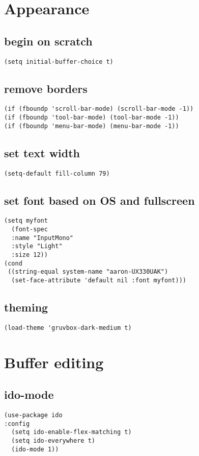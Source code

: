 \documentclass[11pt]{article}
\author{Aaron}
\date{\today}
\title{}
\begin{document}
\tableofcontents

\section{Appearance}
\label{sec:org61c10cf}
\subsection{begin on \textbf{scratch}}
\label{sec:org14f1034}
\begin{verbatim}
(setq initial-buffer-choice t)
\end{verbatim}
\subsection{remove borders}
\label{sec:org0f527e0}
\begin{verbatim}
(if (fboundp 'scroll-bar-mode) (scroll-bar-mode -1))
(if (fboundp 'tool-bar-mode) (tool-bar-mode -1))
(if (fboundp 'menu-bar-mode) (menu-bar-mode -1))
\end{verbatim}
\subsection{set text width}
\label{sec:org0a3673e}
\begin{verbatim}
(setq-default fill-column 79)
\end{verbatim}
\subsection{set font based on OS and fullscreen}
\label{sec:org75c54b4}
\begin{verbatim}
(setq myfont
  (font-spec
  :name "InputMono"
  :style "Light"
  :size 12))
(cond
 ((string-equal system-name "aaron-UX330UAK")
  (set-face-attribute 'default nil :font myfont)))
\end{verbatim}
\subsection{theming}
\label{sec:org2d69631}
\begin{verbatim}
(load-theme 'gruvbox-dark-medium t)
\end{verbatim}
\section{Buffer editing}
\label{sec:org865d877}
\subsection{ido-mode}
\label{sec:orga92aa08}
\begin{verbatim}
(use-package ido
:config
  (setq ido-enable-flex-matching t)
  (setq ido-everywhere t)
  (ido-mode 1))
\end{verbatim}
\end{document}
